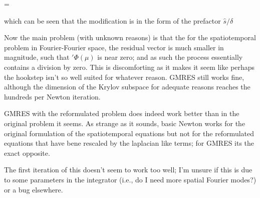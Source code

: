 \begin{description}
{\begin{description}
\beq
\Delta \mu = 
\eeq

which can be seen that the modification is in the form of the prefactor $\hat{s} / \delta$

Now the main problem (with unknown reasons) is that the for the spatiotemporal problem in Fourier-Fourier
space, the residual vector is much smaller in magnitude, such that $\prime{\Phi (\mu)}$ is near zero; and as
such the process essentially contains a division by zero. This is discomforting as it makes it seem like perhaps
the hookstep isn't so well suited for whatever reason. GMRES still works fine, although the dimension of the Krylov
subspace for adequate reasons reaches the hundreds per Newton iteration.

GMRES with the reformulated problem does indeed work better than in the original problem it seems.
As strange as it sounds, basic Newton works for the original formulation of the spatiotemporal equations but not for the
reformulated equations that have bene rescaled by the laplacian like terms; for GMRES its the exact opposite.

\item[mohammad spatiotemporal adjoint]
The first iteration of this doesn't seem to work too well; I'm unsure if this is due to some parameters in the integrator
(i.e., do I need more spatial Fourier modes?) or a bug elsewhere.

\end{description}
}


\end{description}
